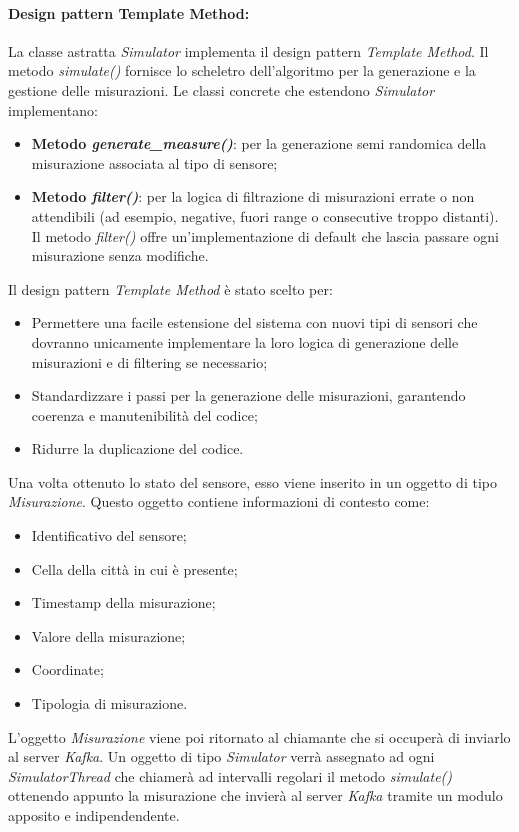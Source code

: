 \paragraph{Design pattern Template Method:}

La classe astratta \textit{Simulator} implementa il design pattern \textit{Template Method}. Il metodo \textit{simulate()} fornisce lo scheletro dell'algoritmo per la generazione e la gestione delle misurazioni. Le classi concrete che estendono \textit{Simulator} implementano:
\begin{itemize}
    \item \textbf{Metodo \textit{generate\_measure()}}: per la generazione semi randomica della misurazione associata al tipo di sensore;
    \item \textbf{Metodo \textit{filter()}}: per la logica di filtrazione di misurazioni errate o non attendibili (ad esempio, negative, fuori range o consecutive troppo distanti). Il metodo \textit{filter()} offre un'implementazione di default che lascia passare ogni misurazione senza modifiche.
\end{itemize}

Il design pattern \textit{Template Method} è stato scelto per:
\begin{itemize}
    \item Permettere una facile estensione del sistema con nuovi tipi di sensori che dovranno unicamente implementare la loro logica di generazione delle misurazioni e di filtering se necessario;
    \item Standardizzare i passi per la generazione delle misurazioni, garantendo coerenza e manutenibilità del codice;
    \item Ridurre la duplicazione del codice.
\end{itemize}

Una volta ottenuto lo stato del sensore, esso viene inserito in un oggetto di tipo \textit{Misurazione}. Questo oggetto contiene informazioni di contesto come:
\begin{itemize}
    \item Identificativo del sensore;
    \item Cella della città in cui è presente;
    \item Timestamp della misurazione;
    \item Valore della misurazione;
    \item Coordinate;
    \item Tipologia di misurazione.
\end{itemize}
L'oggetto \textit{Misurazione} viene poi ritornato al chiamante che si occuperà di inviarlo al server \textit{Kafka}.
Un oggetto di tipo \textit{Simulator} verrà assegnato ad ogni \textit{SimulatorThread} che chiamerà ad intervalli regolari il metodo \textit{simulate()} ottenendo appunto la misurazione che invierà al server \textit{Kafka} tramite un modulo apposito e indipendendente.

